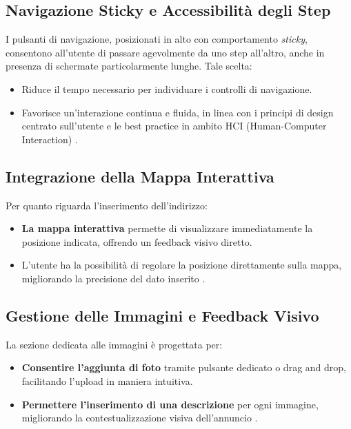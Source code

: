 \subsection*{Navigazione Sticky e Accessibilità degli Step}
I pulsanti di navigazione, posizionati in alto con comportamento \textit{sticky}, consentono all’utente di passare agevolmente da uno step all’altro, anche in presenza di schermate particolarmente lunghe. Tale scelta:
\begin{itemize}
    \item Riduce il tempo necessario per individuare i controlli di navigazione.
    \item Favorisce un’interazione continua e fluida, in linea con i principi di design centrato sull’utente e le best practice in ambito HCI (Human-Computer Interaction) \cite{shneiderman2004}.
\end{itemize}

\subsection*{Integrazione della Mappa Interattiva}
Per quanto riguarda l’inserimento dell’indirizzo:
\begin{itemize}
    \item \textbf{La mappa interattiva} permette di visualizzare immediatamente la posizione indicata, offrendo un feedback visivo diretto.
    \item L’utente ha la possibilità di regolare la posizione direttamente sulla mappa, migliorando la precisione del dato inserito \cite{wickens2008}.
\end{itemize}

\subsection*{Gestione delle Immagini e Feedback Visivo}
La sezione dedicata alle immagini è progettata per:
\begin{itemize}
    \item \textbf{Consentire l’aggiunta di foto} tramite pulsante dedicato o drag and drop, facilitando l’upload in maniera intuitiva.
    \item \textbf{Permettere l’inserimento di una descrizione} per ogni immagine, migliorando la contestualizzazione visiva dell’annuncio \cite{pieters2004}.
\end{itemize}

